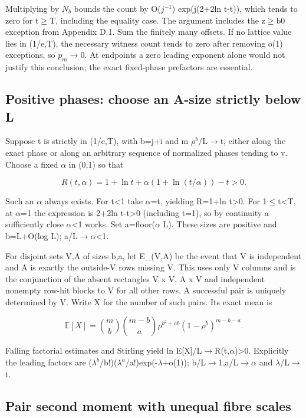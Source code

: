 \documentclass[11pt]{article}
\begin{document}
Multiplying by $N_{b}$ bounds the count by O($j^{-1}$) exp(j(2+2ln t-t)), which tends to zero for t\ensuremath{\geq}T, including the equality case. The argument includes the z\ensuremath{\geq}b0 exception from Appendix D.1. Sum the finitely many offsets. If no lattice value lies in (1/e,T), the necessary witness count tends to zero after removing o(1) exceptions, so $p_m$\ensuremath{\to}0. At endpoints a zero leading exponent alone would not justify this conclusion; the exact fixed-phase prefactors are essential.

\subsection{Positive phases: choose an A-size strictly below L}

Suppose t is strictly in (1/e,T), with b=j+i and m $\rho^{b}$/L\ensuremath{\to}t, either along the exact phase or along an arbitrary sequence of normalized phases tending to v. Choose a fixed $\alpha$ in (0,1) so that

\[
R(t,\alpha)=1+\ln t+\alpha(1+\ln(t/\alpha))-t>0.
\]

Such an $\alpha$ always exists. For t<1 take $\alpha$=t, yielding R=1+ln t>0. For 1\ensuremath{\leq}t<T, at $\alpha$=1 the expression is 2+2ln t-t>0 (including t=1), so by continuity a sufficiently close $\alpha$<1 works. Set a=floor($\alpha$ L). These sizes are positive and b=L+O(log L); a/L\ensuremath{\to}$\alpha$<1.

For disjoint sets V,A of sizes b,a, let E\_(V,A) be the event that V is independent and A is exactly the outside-V rows missing V. This uses only V columns and is the conjunction of the absent rectangles V x V, A x V and independent nonempty row-hit blocks to V for all other rows. A successful pair is uniquely determined by V. Write X for the number of such pairs. Its exact mean is

\[
\mathbb E[X]=\binom mb\binom{m-b}{a}\rho^{b^2+ab}(1-\rho^b)^{m-b-a}.
\]

Falling factorial estimates and Stirling yield ln E[X]/L\ensuremath{\to}R(t,$\alpha$)>0. Explicitly the leading factors are ($\lambda^{b}$/b!)($\lambda^{a}$/a!)exp(-$\lambda$+o(1)); b/L\ensuremath{\to}1,a/L\ensuremath{\to}$\alpha$ and $\lambda$/L\ensuremath{\to}t.

\subsection{Pair second moment with unequal fibre scales}
\end{document}
